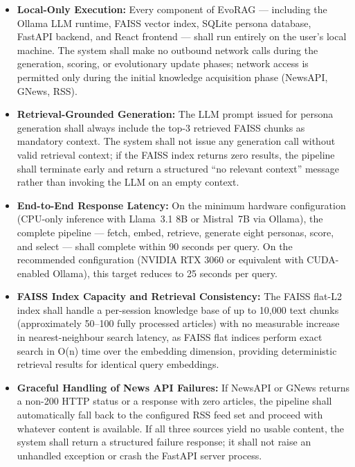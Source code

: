 \begin{itemize}

    \item \textbf{Local-Only Execution:}
    Every component of EvoRAG — including the Ollama LLM runtime, FAISS vector index,
    SQLite persona database, FastAPI backend, and React frontend — shall run entirely
    on the user's local machine. The system shall make no outbound network calls during
    the generation, scoring, or evolutionary update phases; network access is permitted
    only during the initial knowledge acquisition phase (NewsAPI, GNews, RSS).

    \item \textbf{Retrieval-Grounded Generation:}
    The LLM prompt issued for persona generation shall always include the top-3
    retrieved FAISS chunks as mandatory context. The system shall not issue any
    generation call without valid retrieval context; if the FAISS index returns zero
    results, the pipeline shall terminate early and return a structured
    ``no relevant context'' message rather than invoking the LLM on an empty context.

    \item \textbf{End-to-End Response Latency:}
    On the minimum hardware configuration (CPU-only inference with Llama~3.1 8B or
    Mistral~7B via Ollama), the complete pipeline — fetch, embed, retrieve, generate
    eight personas, score, and select — shall complete within 90 seconds per query.
    On the recommended configuration (NVIDIA RTX 3060 or equivalent with CUDA-enabled
    Ollama), this target reduces to 25 seconds per query.

    \item \textbf{FAISS Index Capacity and Retrieval Consistency:}
    The FAISS flat-L2 index shall handle a per-session knowledge base of up to
    10,000 text chunks (approximately 50--100 fully processed articles) with no
    measurable increase in nearest-neighbour search latency, as FAISS flat indices
    perform exact search in O(n) time over the embedding dimension, providing
    deterministic retrieval results for identical query embeddings.

    \item \textbf{Graceful Handling of News API Failures:}
    If NewsAPI or GNews returns a non-200 HTTP status or a response with zero
    articles, the pipeline shall automatically fall back to the configured RSS feed
    set and proceed with whatever content is available. If all three sources yield
    no usable content, the system shall return a structured failure response; it
    shall not raise an unhandled exception or crash the FastAPI server process.


\end{itemize}
